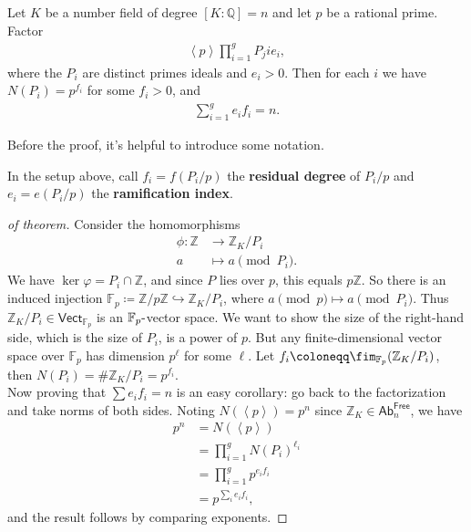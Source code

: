 \begin{theorem}

Let \(K\) be a number field of degree \([K: {\mathbb{Q}}] = n\) and let
\(p\) be a rational prime. Factor
\begin{align*}
\left\langle{ p }\right\rangle \prod_{i=1}^g P_ji{e_i}
,\end{align*}
where the \(P_i\) are distinct primes ideals and \(e_i > 0\). Then for
each \(i\) we have \(N(P_i) = p^{f_i}\) for some \(f_i > 0\), and
\begin{align*}
\sum_{i=1}^g e_i f_i = n
.\end{align*}

Before the proof, it's helpful to introduce some notation.

\end{theorem}

\begin{definition}

In the setup above, call \(f_i = f(P_i / p)\) the \textbf{residual
degree} of \(P_i/p\) and \(e_i = e(P_i/p)\) the \textbf{ramification
index}.

\end{definition}

\begin{proof}[of theorem]

Consider the homomorphisms
\begin{align*}
\phi: {\mathbb{Z}}&\to {\mathbb{Z}}_K/P_i \\
a &\mapsto a \pmod{P_i}
.\end{align*}
We have \(\ker \varphi = P_i \cap{\mathbb{Z}}\), and since \(P\) lies
over \(p\), this equals \(p{\mathbb{Z}}\). So there is an induced
injection
\({\mathbb{F}}_p \coloneqq{\mathbb{Z}}/p{\mathbb{Z}}\hookrightarrow{\mathbb{Z}}_K/ P_i\),
where \(a\pmod p \mapsto a \pmod P_i\). Thus
\({\mathbb{Z}}_K/P_i \in {\mathsf{Vect}}_{{\mathbb{F}}_p}\) is an
\({\mathbb{F}}_p{\hbox{-}}\)vector space. We want to show the size of
the right-hand side, which is the size of \(P_i\), is a power of \(p\).
But any finite-dimensional vector space over \({\mathbb{F}}_p\) has
dimension \(p^\ell\) for some \(\ell\). Let
\(f_i \coloneqq\fim_{{\mathbb{F}}_p} ({\mathbb{Z}}_K/P_i)\), then
\(N(P_i) = \# {\mathbb{Z}}_K/P_i = p^{f_i}\).\\

Now proving that \(\sum e_i f_i = n\) is an easy corollary: go back to
the factorization and take norms of both sides. Noting
\(N( \left\langle{ p }\right\rangle ) = p^n\) since
\({\mathbb{Z}}_K \in {\mathsf{Ab}}_n^{\mathsf{Free}}\), we have
\begin{align*}
p^n 
&= N( \left\langle{ p }\right\rangle  ) \\
&= \prod_{i=1}^g  N(P_i)^{\ell_i} \\
&= \prod_{i=1}^g p^{e_i f_i} \\
&= p^{\sum_i e_i f_i}
,\end{align*}
and the result follows by comparing exponents.

\end{proof}

